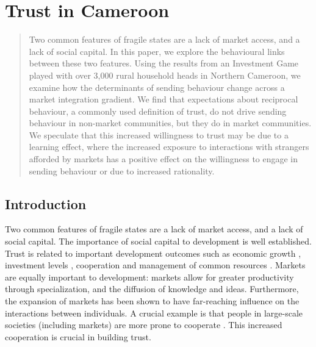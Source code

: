 \chapter{Trust in Cameroon}
\label{chap:cameroontrust}

\renewcommand{\thetable}{\arabic{chapter}.\arabic{table}}


\begin{abstract}
Two common features of fragile states are a lack of market access, and a lack of social capital. In this paper, we explore the behavioural links between these two features. Using the results from an Investment Game played with over 3,000 rural household heads in Northern Cameroon, we examine how the determinants of sending behaviour change across a market integration gradient. We find that expectations about reciprocal behaviour, a commonly used definition of trust, do not drive sending behaviour in non-market communities, but they do in market communities. We speculate that this increased willingness to trust may be due to a learning effect, where the increased exposure to interactions with strangers afforded by markets has a positive effect on the willingness to engage in sending behaviour or due to increased rationality.
\end{abstract}


\section{Introduction}

Two common features of fragile states are a lack of market access, and a lack of social capital. The importance of social capital to development is well established. Trust is related to important development outcomes such as economic growth \citep{Knack1997}, investment levels \citep{Zak2001}, cooperation \citep{Gachter2004,Sonderskov2011} and management of common resources \citep{Bouma2008}. Markets are equally important to development: markets allow for greater productivity through specialization, and the diffusion of knowledge and ideas. Furthermore, the expansion of markets has been shown to have far-reaching influence on the interactions between individuals. A crucial example is that people in large-scale societies (including markets) are more prone to cooperate \citep{Henrich2010}. This increased cooperation is crucial in building trust.

